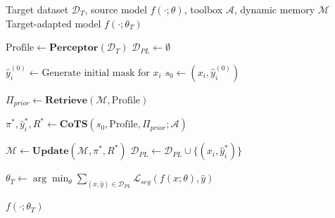 \begin{algorithm}[t]
\caption{Search2Adapt Framework}
\label{alg:Search2Adapt}
\begin{algorithmic}[1]
\Require Target dataset $\mathcal{D}_T$, source model $f(\cdot;\theta)$, toolbox $\mathcal{A}$, dynamic memory $\mathcal{M}$
\Ensure Target-adapted model $f(\cdot;\theta_T)$

\State $\text{Profile} \leftarrow \textbf{Perceptor}(\mathcal{D}_T)$ 
\State $\mathcal{D}_{PL} \leftarrow \emptyset$ 

    \State $\hat{y}_i^{(0)} \leftarrow \text{Generate initial mask for } x_i$ 
    \State $s_0 \leftarrow (x_i, \hat{y}_i^{(0)})$ 
    
    \State $\Pi_{prior} \leftarrow \textbf{Retrieve}(\mathcal{M}, \text{Profile})$ 
    
    \State $\pi^*, \hat{y}_i^*, R^* \leftarrow \textbf{CoTS}(s_0, \text{Profile}, \Pi_{prior}; \mathcal{A})$ %
    
    \State $\mathcal{M} \leftarrow \textbf{Update}(\mathcal{M}, \pi^*, R^*)$ 
    \State $\mathcal{D}_{PL} \leftarrow \mathcal{D}_{PL} \cup \{(x_i, \hat{y}_i^*)\}$
\EndFor

\State $\theta_T \leftarrow \arg\min_{\theta} \sum_{(x,\hat{y})\in \mathcal{D}_{PL}} \mathcal{L}_{seg}(f(x;\theta), \hat{y})$ 

\State \Return $f(\cdot;\theta_T)$
\end{algorithmic}
\end{algorithm}